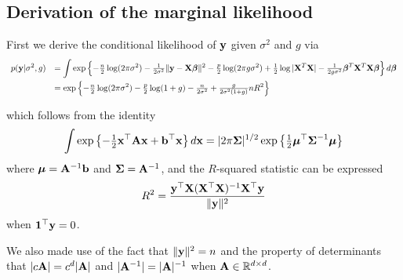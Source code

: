 \documentclass{amsart}[12pt]
\begin{document}
\subsection{Derivation of the marginal likelihood}




 
\noindent First we derive the conditional likelihood of ${\bf y}$ given $\sigma^2$ and $g$ via
$$
\begin{array}{rl}
	\displaystyle p({\bf y}|\sigma^2,g) 
	  & \displaystyle = \int \exp\left\{ 
	-\tfrac{n}{2}\log(2\pi\sigma^2) - \tfrac{1}{2\sigma^2}\|{\bf y} - {\bf X}{\boldsymbol \beta}\|^2
	-\tfrac{p}{2}\log(2\pi g\sigma^2) + \tfrac{1}{2}\log|{\bf X}^T{\bf X}| - \tfrac{1}{2g\sigma^2}{\boldsymbol \beta}^T{\bf X}^T{\bf X}{\boldsymbol \beta}
	\right\} d{\boldsymbol \beta}
	\\ [2ex]
	  & \displaystyle = \exp\left\{      
	-\tfrac{n}{2}\log(2\pi\sigma^2) 
	- \tfrac{p}{2}\log(1+g)
	- \tfrac{n}{2\sigma^2} 
	+ \tfrac{g}{2\sigma^2(1+g)} n R^2
	\right\}
\end{array}
$$

\noindent which follows from the identity
\begin{equation}\label{res:01}
	\int \exp\left\{ -\tfrac{1}{2}{\bf x}^\top{\bf A}{\bf x} + {\bf b}^\top{\bf x} \right\} d {\bf x} = |2\pi{\boldsymbol\Sigma}|^{1/2} \exp\left\{ \tfrac{1}{2}{\boldsymbol \mu}^\top{\boldsymbol\Sigma}^{-1}{\boldsymbol \mu} \right\}
\end{equation}
where ${\boldsymbol \mu} = {\bf A}^{-1}{\bf b}$ and ${\boldsymbol \Sigma} = {\bf A}^{-1}$, and the $R$-squared statistic can be expressed
\begin{equation} \label{res:02}
	R^2 = \frac{{\bf y}^\top{\bf X}({\bf X}^\top{\bf X})^{-1}{\bf X}^\top{\bf y}}{\|{\bf y}\|^2}
\end{equation}
when ${\bf 1}^\top{\bf y}=0$.

We also made use of the fact that $\|{\bf y}\|^2 = n$ and the property of determinants that $|c{\bf A}| = c^d|{\bf A}|$ and $|{\bf A}^{-1}| = |{\bf A}|^{-1}$ when ${\bf A} \in{\mathbb R}^{d\times d}$.

\end{document}
